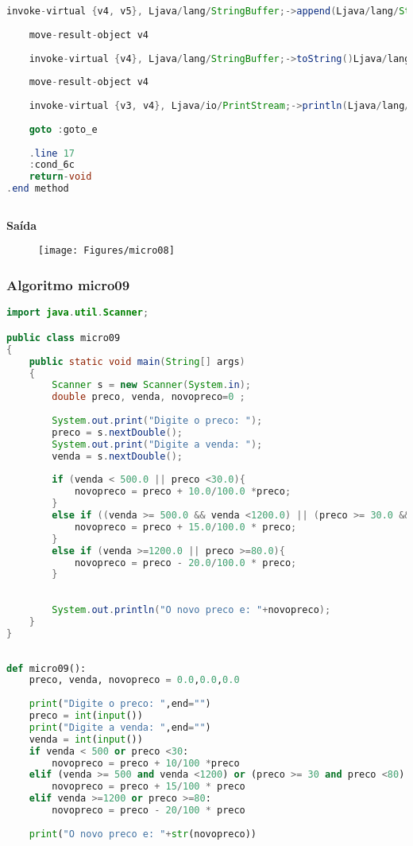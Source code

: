 \documentclass[hidelinks,12pt]{article}
\begin{document}
\begin{lstlisting}[caption=Smali resultante do .java,language=java]
	invoke-virtual {v4, v5}, Ljava/lang/StringBuffer;->append(Ljava/lang/String;)Ljava/lang/StringBuffer;
	
	move-result-object v4
	
	invoke-virtual {v4}, Ljava/lang/StringBuffer;->toString()Ljava/lang/String;
	
	move-result-object v4
	
	invoke-virtual {v3, v4}, Ljava/io/PrintStream;->println(Ljava/lang/String;)V
	
	goto :goto_e
	
	.line 17
	:cond_6c
	return-void
.end method	
	
	\end{lstlisting}
	
	{\large{\textbf{Saída}}}
	
	\begin{figure}[!h]
		\centering
		\texttt{[image: Figures/micro08]}
	\end{figure}
	
	
	\subsubsection{Algoritmo micro09}
	
	\begin{lstlisting}[caption=Código em Java,language=java]
import java.util.Scanner;

public class micro09
{
	public static void main(String[] args)
	{
		Scanner s = new Scanner(System.in);
		double preco, venda, novopreco=0 ;
		
		System.out.print("Digite o preco: ");
		preco = s.nextDouble();
		System.out.print("Digite a venda: ");
		venda = s.nextDouble();
		
		if (venda < 500.0 || preco <30.0){
			novopreco = preco + 10.0/100.0 *preco;
		}
		else if ((venda >= 500.0 && venda <1200.0) || (preco >= 30.0 && preco <80.0)){
			novopreco = preco + 15.0/100.0 * preco;
		}
		else if (venda >=1200.0 || preco >=80.0){
			novopreco = preco - 20.0/100.0 * preco;
		}
		
		
		System.out.println("O novo preco e: "+novopreco);
	}
}	
	
	\end{lstlisting}
	
	\begin{lstlisting}[caption=Código em python,language=Python]
def micro09():
	preco, venda, novopreco = 0.0,0.0,0.0
	
	print("Digite o preco: ",end="")
	preco = int(input())
	print("Digite a venda: ",end="")
	venda = int(input())
	if venda < 500 or preco <30:
		novopreco = preco + 10/100 *preco
	elif (venda >= 500 and venda <1200) or (preco >= 30 and preco <80):
		novopreco = preco + 15/100 * preco
	elif venda >=1200 or preco >=80:
		novopreco = preco - 20/100 * preco
	
	print("O novo preco e: "+str(novopreco))
	
	
	\end{lstlisting}
	
\end{document}
